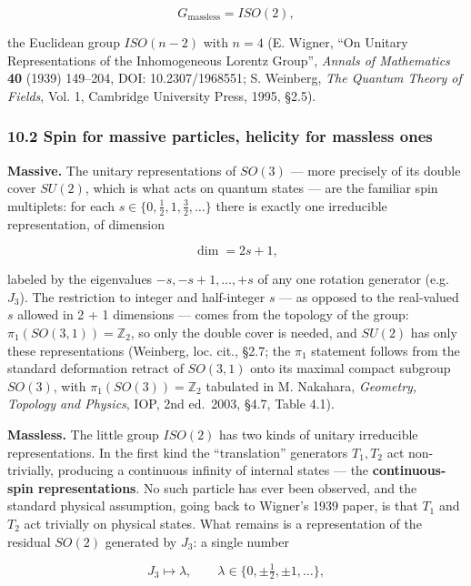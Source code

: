 \documentclass[
]{article}
\begin{document}
\[G_{\mathrm{massless}} = ISO(2), \tag{68}\]

the Euclidean group \(ISO(n-2)\) with \(n = 4\) (E. Wigner, ``On Unitary
Representations of the Inhomogeneous Lorentz Group'', \emph{Annals of
Mathematics} \textbf{40} (1939) 149--204, DOI: 10.2307/1968551; S.
Weinberg, \emph{The Quantum Theory of Fields}, Vol. 1, Cambridge
University Press, 1995, §2.5).

\hypertarget{spin-for-massive-particles-helicity-for-massless-ones}{%
\subsubsection{10.2 Spin for massive particles, helicity for massless
ones}\label{spin-for-massive-particles-helicity-for-massless-ones}}

\textbf{Massive.} The unitary representations of \(SO(3)\) --- more
precisely of its double cover \(SU(2)\), which is what acts on quantum
states --- are the familiar spin multiplets: for each
\(s \in \{0, \tfrac{1}{2}, 1, \tfrac{3}{2}, \ldots\}\) there is exactly
one irreducible representation, of dimension

\[\dim = 2s + 1, \tag{69}\]

labeled by the eigenvalues \(-s, -s+1, \ldots, +s\) of any one rotation
generator (e.g.~\(J_{3}\)). The restriction to integer and half-integer
\(s\) --- as opposed to the real-valued \(s\) allowed in 2 + 1
dimensions --- comes from the topology of the group:
\(\pi_{1}(SO(3,1)) = \mathbb{Z}_{2}\), so only the double cover is
needed, and \(SU(2)\) has only these representations (Weinberg, loc.
cit., §2.7; the \(\pi_{1}\) statement follows from the standard
deformation retract of \(SO(3,1)\) onto its maximal compact subgroup
\(SO(3)\), with \(\pi_{1}(SO(3)) = \mathbb{Z}_{2}\) tabulated in M.
Nakahara, \emph{Geometry, Topology and Physics}, IOP, 2nd ed.~2003,
§4.7, Table 4.1).

\textbf{Massless.} The little group \(ISO(2)\) has two kinds of unitary
irreducible representations. In the first kind the ``translation''
generators \(T_{1}, T_{2}\) act non-trivially, producing a continuous
infinity of internal states --- the \textbf{continuous-spin
representations}. No such particle has ever been observed, and the
standard physical assumption, going back to Wigner's 1939 paper, is that
\(T_{1}\) and \(T_{2}\) act trivially on physical states. What remains
is a representation of the residual \(SO(2)\) generated by \(J_{3}\): a
single number

\[J_{3} \longmapsto \lambda, \qquad \lambda \in \{0, \pm \tfrac{1}{2}, \pm 1, \ldots\}, \tag{70}\]
\end{document}
